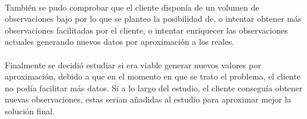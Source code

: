 \paragraph{}
También se pudo comprobar que el cliente disponía de un volumen de observaciones bajo por lo que se planteo la posibilidad de, o intentar obtener más observaciones facilitadas por el cliente, o intentar enriquecer las observaciones actuales generando nuevos datos por aproximación a los reales.

\paragraph{}
Finalmente se decidió estudiar si era viable generar nuevos valores por aproximación, debido a que en el momento en que se trato el problema, el cliente no podía facilitar más datos. Si a lo largo del estudio, el cliente conseguía obtener nuevas observaciones, estas serian añadidas al estudio para aproximar mejor la solución final.
